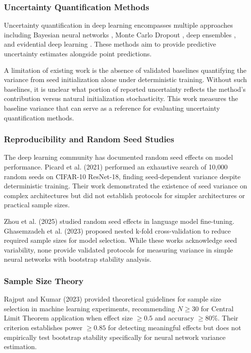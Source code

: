 
\subsubsection{Uncertainty Quantification Methods}

Uncertainty quantification in deep learning encompasses multiple approaches including Bayesian neural networks \citep{gal2016dropout}, Monte Carlo Dropout \citep{gal2016dropout}, deep ensembles \citep{lakshminarayanan2017simple}, and evidential deep learning \citep{sensoy2018evidential}. These methods aim to provide predictive uncertainty estimates alongside point predictions.

A limitation of existing work is the absence of validated baselines quantifying the variance from seed initialization alone under deterministic training. Without such baselines, it is unclear what portion of reported uncertainty reflects the method's contribution versus natural initialization stochasticity. This work measures the baseline variance that can serve as a reference for evaluating uncertainty quantification methods.

\subsubsection{Reproducibility and Random Seed Studies}

The deep learning community has documented random seed effects on model performance. Picard et al. (2021) performed an exhaustive search of 10,000 random seeds on CIFAR-10 ResNet-18, finding seed-dependent variance despite deterministic training. Their work demonstrated the existence of seed variance on complex architectures but did not establish protocols for simpler architectures or practical sample sizes.

Zhou et al. (2025) studied random seed effects in language model fine-tuning. Ghasemzadeh et al. (2023) proposed nested k-fold cross-validation to reduce required sample sizes for model selection. While these works acknowledge seed variability, none provide validated protocols for measuring variance in simple neural networks with bootstrap stability analysis.

\subsubsection{Sample Size Theory}

Rajput and Kumar (2023) provided theoretical guidelines for sample size selection in machine learning experiments, recommending $N\geq 30$ for Central Limit Theorem application when effect size $\geq 0.5$ and accuracy $\geq 80$\%. Their criterion establishes power $\geq 0.85$ for detecting meaningful effects but does not empirically test bootstrap stability specifically for neural network variance estimation.


